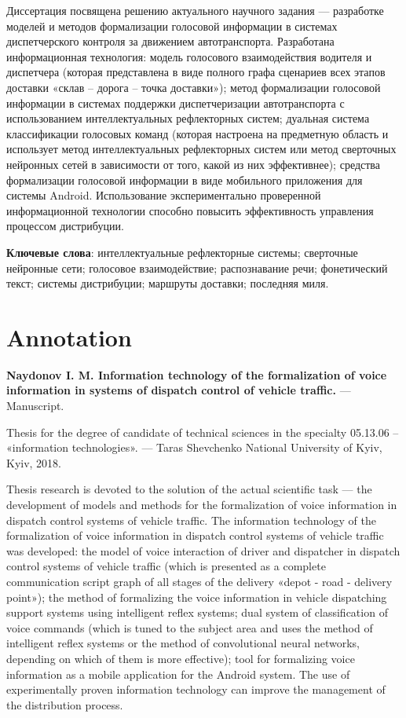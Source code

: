 Диссертация посвящена решению актуального научного задания --- разработке моделей и методов формализации голосовой информации в системах диспетчерского контроля за движением автотранспорта. Разработана информационная технология: модель голосового взаимодействия водителя и диспетчера (которая представлена в виде полного графа сценариев всех этапов доставки «склав -- дорога -- точка доставки»); метод формализации голосовой информации в системах поддержки диспетчеризации автотранспорта с использованием интеллектуальных рефлекторных систем; дуальная система классификации голосовых команд (которая настроена на предметную область и использует метод интеллектуальных рефлекторных систем или метод сверточных нейронных сетей в зависимости от того, какой из них эффективнее); средства формализации голосовой информации в виде мобильного приложения для системы Android. Использование экспериментально проверенной информационной технологии способно повысить эффективность управления процессом дистрибуции.

\textbf{Ключевые слова}: интеллектуальные рефлекторные системы; сверточные нейронные
сети; голосовое взаимодействие; распознавание речи; фонетический текст; системы дистрибуции; маршруты доставки; последняя миля.

\section*{Annotation}

\textbf{Naydonov I. M. Information technology of the formalization of voice information in systems of dispatch control of vehicle traffic.} --- Manuscript.

Thesis for the degree of candidate of technical sciences in the specialty 05.13.06 -- «information technologies». --- Taras Shevchenko National University of Kyiv, Kyiv, 2018.

Thesis research is devoted to the solution of the actual scientific task --- the development of models and methods for the formalization of voice information in dispatch control systems of vehicle traffic. The information technology of the formalization of voice information in dispatch control systems of vehicle traffic was developed: the model of voice interaction of driver and dispatcher in dispatch control systems of vehicle traffic (which is presented as a complete communication script graph of all stages of the delivery «depot - road - delivery point»); the method of formalizing the voice information in vehicle dispatching support systems using intelligent reflex systems; dual system of classification of voice commands (which is tuned to the subject area and uses the method of intelligent reflex systems or the method of convolutional neural networks, depending on which of them is more effective); tool for formalizing voice information as a mobile application for the Android system. The use of experimentally proven information technology can improve the management of the distribution process.

